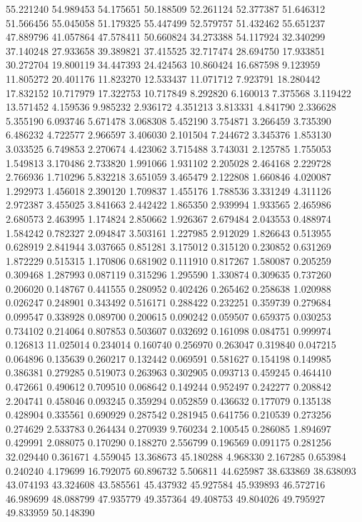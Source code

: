 55.221240
54.989453
54.175651
50.188509
52.261124
52.377387
51.646312
51.566456
55.045058
51.179325
55.447499
52.579757
51.432462
55.651237
47.889796
41.057864
47.578411
50.660824
34.273388
54.117924
32.340299
37.140248
27.933658
39.389821
37.415525
32.717474
28.694750
17.933851
30.272704
19.800119
34.447393
24.424563
10.860424
16.687598
9.123959
11.805272
20.401176
11.823270
12.533437
11.071712
7.923791
18.280442
17.832152
10.717979
17.322753
10.717849
8.292820
6.160013
7.375568
3.119422
13.571452
4.159536
9.985232
2.936172
4.351213
3.813331
4.841790
2.336628
5.355190
6.093746
5.671478
3.068308
5.452190
3.754871
3.266459
3.735390
6.486232
4.722577
2.966597
3.406030
2.101504
7.244672
3.345376
1.853130
3.033525
6.749853
2.270674
4.423062
3.715488
3.743031
2.125785
1.755053
1.549813
3.170486
2.733820
1.991066
1.931102
2.205028
2.464168
2.229728
2.766936
1.710296
5.832218
3.651059
3.465479
2.122808
1.660846
4.020087
1.292973
1.456018
2.390120
1.709837
1.455176
1.788536
3.331249
4.311126
2.972387
3.455025
3.841663
2.442422
1.865350
2.939994
1.933565
2.465986
2.680573
2.463995
1.174824
2.850662
1.926367
2.679484
2.043553
0.488974
1.584242
0.782327
2.094847
3.503161
1.227985
2.912029
1.826643
0.513955
0.628919
2.841944
3.037665
0.851281
3.175012
0.315120
0.230852
0.631269
1.872229
0.515315
1.170806
0.681902
0.111910
0.817267
1.580087
0.205259
0.309468
1.287993
0.087119
0.315296
1.295590
1.330874
0.309635
0.737260
0.206020
0.148767
0.441555
0.280952
0.402426
0.265462
0.258638
1.020988
0.026247
0.248901
0.343492
0.516171
0.288422
0.232251
0.359739
0.279684
0.099547
0.338928
0.089700
0.200615
0.090242
0.059507
0.659375
0.030253
0.734102
0.214064
0.807853
0.503607
0.032692
0.161098
0.084751
0.999974
0.126813
11.025014
0.234014
0.160740
0.256970
0.263047
0.319840
0.047215
0.064896
0.135639
0.260217
0.132442
0.069591
0.581627
0.154198
0.149985
0.386381
0.279285
0.519073
0.263963
0.302905
0.093713
0.459245
0.464410
0.472661
0.490612
0.709510
0.068642
0.149244
0.952497
0.242277
0.208842
2.204741
0.458046
0.093245
0.359294
0.052859
0.436632
0.177079
0.135138
0.428904
0.335561
0.690929
0.287542
0.281945
0.641756
0.210539
0.273256
0.274629
2.533783
0.264434
0.270939
9.760234
2.100545
0.286085
1.894697
0.429991
2.088075
0.170290
0.188270
2.556799
0.196569
0.091175
0.281256
32.029440
0.361671
4.559045
13.368673
45.180288
4.968330
2.167285
0.653984
0.240240
4.179699
16.792075
60.896732
5.506811
44.625987
38.633869
38.638093
43.074193
43.324608
43.585561
45.437932
45.927584
45.939893
46.572716
46.989699
48.088799
47.935779
49.357364
49.408753
49.804026
49.795927
49.833959
50.148390
